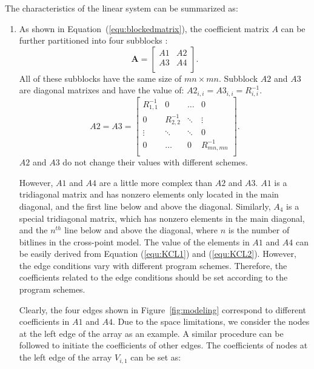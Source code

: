 The characteristics of the linear system can be summarized as:
\begin{enumerate}
  \item As shown in Equation~(\ref{equ:blockedmatrix}), the
      coefficient matrix $A$ can be further partitioned into four
      subblocks :
    \begin{equation}\label{equ:blockedmatrix}
        \mathbf{A} = \left[
        \begin{array}{cc}
            A1 & A2  \\
            A3 & A4  \\
        \end{array} \right].
    \end{equation}
All of these subblocks have the same size of $mn\times mn$. Subblock
$A2$ and $A3$ are diagonal matrixes and have the value of: $A2_{i,i} =
A3_{i,i} = R_{i,i}^{-1}$.
\begin{equation}\label{equ:A2A3}
        A2 = A3 = \left[
        \begin{array}{cccc}
            R_{1,1}^{-1}    & 0             & \ldots    & 0 \\
            0               & R_{2,2}^{-1}  & \ddots    & \vdots  \\
            \vdots          & \ddots        & \ddots    & 0 \\
            0               & \ldots        & 0         & R_{mn,mn}^{-1} \\
        \end{array} \right].
    \end{equation}
$A2$ and $A3$ do not change their values with different schemes.

However, $A1$ and $A4$ are a little more complex than $A2$ and $A3$.
$A1$ is a tridiagonal matrix and has nonzero elements only located in
the main diagonal, and the first line below and above the diagonal.
Similarly, $A_4$ is a special tridiagonal matrix, which has nonzero
elements in the main diagonal, and the $n^{th}$ line below and above
the diagonal, where $n$ is the number of bitlines in the cross-point
model. The value of the elements in $A1$ and $A4$ can be easily
derived from Equation (\ref{equ:KCL1}) and (\ref{equ:KCL2}). However,
the edge conditions vary with different program schemes. Therefore,
the coefficients related to the edge conditions should be set
according to the program schemes.


Clearly, the four edges shown in Figure~\ref{fig:modeling} correspond
to different coefficients in $A1$ and $A4$. Due to the space
limitations, we consider the nodes at the left edge of the array as an
example. A similar procedure can be followed to initiate the
coefficients of other edges. The coefficients of nodes at the left
edge of the array $V_{i,1}$ can be set as:


\end{enumerate}
